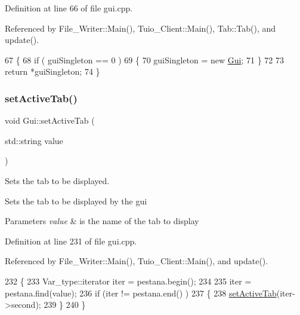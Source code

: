 Definition at line 66 of file gui.\+cpp.



Referenced by File\+\_\+\+Writer\+::\+Main(), Tuio\+\_\+\+Client\+::\+Main(), Tab\+::\+Tab(), and update().


\begin{DoxyCode}
67 \{
68     \textcolor{keywordflow}{if} ( guiSingleton == 0 )
69     \{
70         guiSingleton = \textcolor{keyword}{new} \hyperlink{class_gui}{Gui};
71     \}
72     
73     \textcolor{keywordflow}{return} *guiSingleton;
74 \}
\end{DoxyCode}
\mbox{\label{class_gui_a30be0666694e35dbcc4f6473e02b6fdc}} 
\subsubsection{\texorpdfstring{set\+Active\+Tab()}{setActiveTab()}\hspace{0.1cm}{\footnotesize\ttfamily [1/2]}}
{\footnotesize\ttfamily void Gui\+::set\+Active\+Tab (\begin{DoxyParamCaption}\item[{std\+::string}]{value }\end{DoxyParamCaption})}



Sets the tab to be displayed. 

Sets the tab to be displayed by the gui 
\begin{DoxyParams}{Parameters}
{\em value} & is the name of the tab to display \\
\hline
\end{DoxyParams}


Definition at line 231 of file gui.\+cpp.



Referenced by File\+\_\+\+Writer\+::\+Main(), Tuio\+\_\+\+Client\+::\+Main(), and update().


\begin{DoxyCode}
232 \{
233     Var\_type::iterator iter = pestana.begin();
234 
235     iter = pestana.find(value);
236     \textcolor{keywordflow}{if} (iter != pestana.end() )
237     \{
238       \hyperlink{class_gui_a30be0666694e35dbcc4f6473e02b6fdc}{setActiveTab}(iter->second);
239     \}
240 \}
\end{DoxyCode}
\mbox{\label{class_gui_ae192d588b4f3cfef2ed9772d74689465}} 
